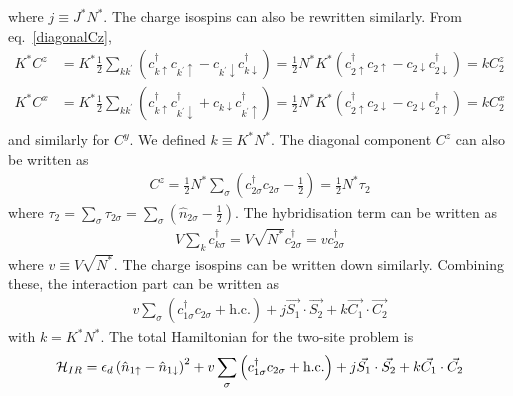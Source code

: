 \documentclass[12pt,twoside]{article}
\numberwithin{equation}{section}
\begin{document}
where \(j \equiv J^* N^*\). The charge isospins can also be rewritten similarly. From eq.~\ref{diagonalCz},
\begin{equation}\begin{aligned}
	K^* C^z &=K^* \frac{1}{2}\sum_{kk^\prime}\left( c^\dagger_{k \uparrow}c_{k^\prime \uparrow} - c_{k^\prime \downarrow}c^\dagger_{k \downarrow} \right) = \frac{1}{2}N^* K^*\left( c^\dagger_{2 \uparrow}c_{2 \uparrow} - c_{2 \downarrow}c^\dagger_{2\downarrow} \right) = kC_2^z\\
	K^* C^x &=K^* \frac{1}{2}\sum_{kk^\prime}\left( c^\dagger_{k \uparrow}c^\dagger_{k^\prime \downarrow} + c_{k \downarrow}c^\dagger_{k^\prime \uparrow} \right) = \frac{1}{2}N^* K^*\left( c^\dagger_{2 \uparrow}c_{2 \downarrow} - c_{2 \downarrow}c^\dagger_{2\uparrow} \right) = kC_2^x\\
\end{aligned}\end{equation}
and similarly for \(C^y\). We defined \(k \equiv K^* N^*\). The diagonal component \(C^z\) can also be written as
\begin{equation}\begin{aligned}
	 C^z = \frac{1}{2}N^* \sum_\sigma\left(c^\dagger_{2\sigma}c_{2\sigma} - \frac{1}{2}\right) = \frac{1}{2}N^*\tau_2
\end{aligned}\end{equation}
where \(\tau_2 = \sum_\sigma \tau_{2\sigma} = \sum_\sigma \left( \hat n_{2\sigma} - \frac{1}{2} \right) \). The hybridisation term can be written as
\begin{equation}\begin{aligned}
	V\sum_k c^\dagger_{k\sigma} = V\sqrt{N^*} c^\dagger_{2\sigma} = vc^\dagger_{2\sigma}
\end{aligned}\end{equation}
where \(v \equiv V\sqrt{N^*}\). The charge isospins can be written down similarly. Combining these, the interaction part can be written as
\begin{equation}\begin{aligned}
v\sum_{\sigma}\left( c^\dagger_{1\sigma}c_{2\sigma} + \text{h.c.} \right) + j\vec{S_1}\cdot\vec{S_2} + k\vec{C_1}\cdot\vec{C_2}
\end{aligned}\end{equation}
with \(k = K^* N^*\). The total Hamiltonian for the two-site problem is
\begin{equation}\begin{aligned}
	\mathcal{H}_{IR} = \epsilon_d \left(\hat n_{1 \uparrow} - \hat n_{1 \downarrow}\right)^2 + v\sum_{\sigma}\left(c^\dagger_{1\sigma}c_{2\sigma} + \text{h.c.} \right) + j\vec{S_1}\cdot\vec{S_2} + k \vec{C_1}\cdot\vec{C_2}
\end{aligned}\end{equation}
\end{document}
